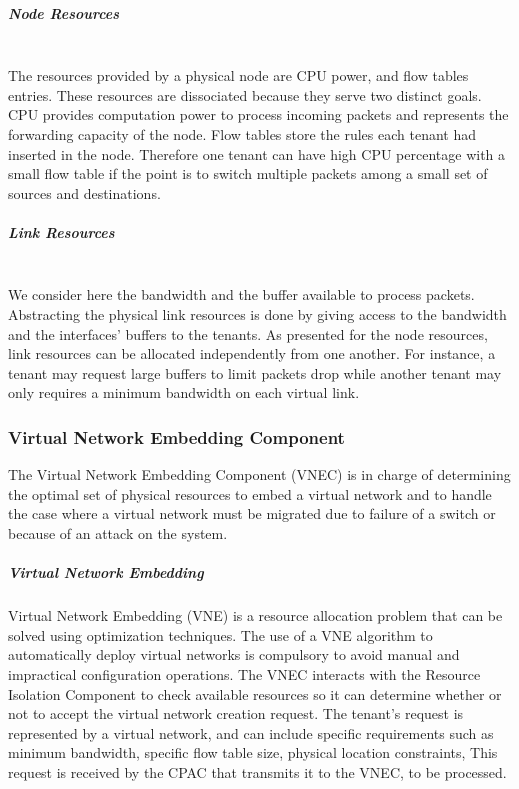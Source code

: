 \subparagraph{\textbf{Node Resources}}\textbf{}\\
The resources provided by a physical node are CPU power, and flow tables entries.
These resources are dissociated because they serve two distinct goals.
CPU provides computation power to process incoming packets and represents the forwarding capacity of the node.
Flow tables store the rules each tenant had inserted in the node.
Therefore one tenant can have high CPU percentage with a small flow table if the point is to switch multiple packets among a small set of sources and destinations.

\subparagraph{\textbf{Link Resources}}\textbf{}\\
We consider here the bandwidth and the buffer available to process packets.
Abstracting the physical link resources is done by giving access to the bandwidth and the interfaces' buffers to the tenants.
As presented for the node resources, link resources can be allocated independently from one another.
For instance, a tenant may request large buffers to limit packets drop while another tenant may only requires a minimum bandwidth on each virtual link.

\subsubsection{Virtual Network Embedding Component}

The Virtual Network Embedding Component (VNEC) is in charge of determining the optimal set of physical resources to embed a virtual network and to handle the case where a virtual network must be migrated due to failure of a switch or because of an attack on the system.

\subparagraph{Virtual Network Embedding}
Virtual Network Embedding (VNE) is a resource allocation problem that can be solved using optimization techniques.
The use of a VNE algorithm to automatically deploy virtual networks is compulsory to avoid manual and impractical configuration operations.
The VNEC interacts with the Resource Isolation Component to check available resources so it can determine whether or not to accept the virtual network creation request.
The tenant's request is represented by a virtual network, and can include specific requirements such as minimum bandwidth, specific flow table  size, physical location constraints, \etc 
This request is received by the CPAC that transmits it to the VNEC, to be processed.


